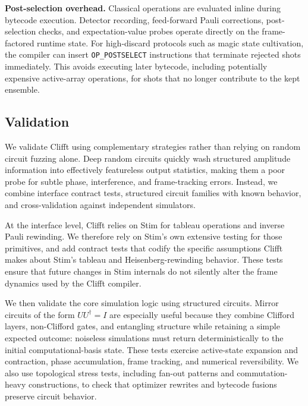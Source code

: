\documentclass[a4paper, onecolumn, unpublished]{quantumarticle}
\begin{document}
    \textbf{Post-selection overhead.}
    Classical operations are evaluated inline during bytecode execution. Detector recording, feed-forward Pauli corrections, post-selection checks, and expectation-value probes operate directly on the frame-factored runtime state. For high-discard protocols such as magic state cultivation, the compiler can insert \texttt{OP\_POSTSELECT} instructions that terminate rejected shots immediately. This avoids executing later bytecode, including potentially expensive active-array operations, for shots that no longer contribute to the kept ensemble.

    \subsection{ Validation}
    \label{sec:validation}

    We validate Clifft using complementary strategies rather than relying on random circuit fuzzing alone. Deep random circuits quickly wash structured amplitude information into effectively featureless output statistics, making them a poor probe for subtle phase, interference, and frame-tracking errors. Instead, we combine interface contract tests, structured circuit families with known behavior, and cross-validation against independent simulators.

    At the interface level, Clifft relies on Stim for tableau operations and inverse Pauli rewinding. We therefore rely on Stim's own extensive testing for those primitives, and add contract tests that codify the specific assumptions Clifft makes about Stim's tableau and Heisenberg-rewinding behavior. These tests ensure that future changes in Stim internals do not silently alter the frame dynamics used by the Clifft compiler.

    We then validate the core simulation logic using structured circuits. Mirror circuits of the form $U U^\dagger = I$ are especially useful because they combine Clifford layers, non-Clifford gates, and entangling structure while retaining a simple expected outcome: noiseless simulations must return deterministically to the initial computational-basis state. These tests exercise active-state expansion and contraction, phase accumulation, frame tracking, and numerical reversibility. We also use topological stress tests, including fan-out patterns and commutation-heavy constructions, to check that optimizer rewrites and bytecode fusions preserve circuit behavior.
\end{document}
